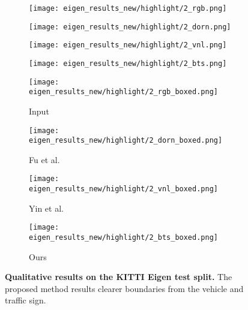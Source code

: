 \documentclass[10pt,twocolumn,letterpaper]{article}
\begin{document}
\begin{figure*}
	\begin{subfigure}{.18\linewidth}
		\centering
		\texttt{[image: eigen\_results\_new/highlight/2\_rgb.png]}
	\end{subfigure}
	\hspace{1em}
	\begin{subfigure}{.18\linewidth}
		\centering
		\texttt{[image: eigen\_results\_new/highlight/2\_dorn.png]}
	\end{subfigure}
	\hspace{1em}
	\begin{subfigure}{.18\linewidth}
		\centering
		\texttt{[image: eigen\_results\_new/highlight/2\_vnl.png]}
	\end{subfigure}
	\hspace{1em}
	\begin{subfigure}{.18\linewidth}
		\centering
		\texttt{[image: eigen\_results\_new/highlight/2\_bts.png]}
	\end{subfigure}
	
	\begin{subfigure}{.18\linewidth}
		\centering
		\texttt{[image: eigen\_results\_new/highlight/2\_rgb\_boxed.png]}
		\caption{Input}
	\end{subfigure}
	\hspace{1em}
	\begin{subfigure}{.18\linewidth}
		\centering
		\texttt{[image: eigen\_results\_new/highlight/2\_dorn\_boxed.png]}
		\caption{Fu et al. \cite{fu2018deep}}		
	\end{subfigure}
	\hspace{1em}
	\begin{subfigure}{.18\linewidth}
		\centering
		\texttt{[image: eigen\_results\_new/highlight/2\_vnl\_boxed.png]}
		\caption{Yin et al. \cite{yin2019enforcing}}
	\end{subfigure}
	\hspace{1em}
	\begin{subfigure}{.18\linewidth}
		\centering
		\texttt{[image: eigen\_results\_new/highlight/2\_bts\_boxed.png]}
		\caption{Ours}
	\end{subfigure}
	\caption{\textbf{Qualitative results on the KITTI Eigen test split.} The proposed method results clearer boundaries from the vehicle and traffic sign.}
	\label{fg:kitti_qualitative_result}
\end{figure*}
\end{document}

